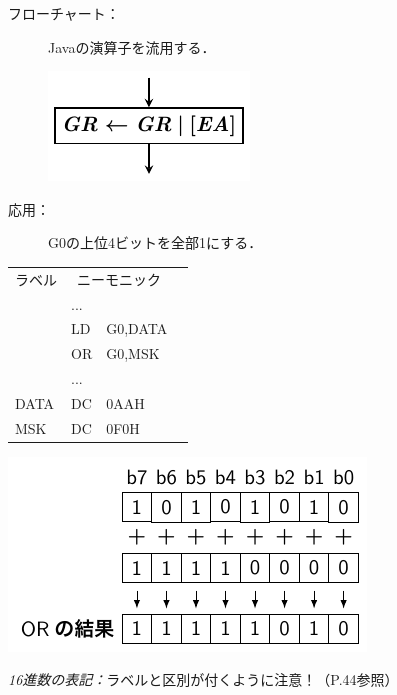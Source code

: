 \documentclass[handout]{beamer}        %
\begin{document}
\begin{frame}
  \begin{description}
  \item[フローチャート：] Javaの演算子を流用する．\\
  \vfill
    \centerline{\includegraphics[scale=0.7]{../Tikz/or_chap5.pdf}}
  \vfill
  \item[応用：] G0の上位4ビットを全部1にする．
  \end{description}
  \vfill
  \begin{minipage}{0.48\columnwidth}
    {\ttfamily\small\begin{center}
      \begin{tabular}{|l|l l|l}
        \cline{1-3}
        ラベル & \multicolumn{2}{|c|}{ニーモニック} & \\
        \cline{1-3}
        & ...  &        & \\
        & LD   & G0,DATA& \\
        & OR   & G0,MSK & \\
        & ...  &        & \\
        DATA& DC   & 0AAH    & \\
        MSK & DC   & 0F0H    & \\
        \cline{1-3}
      \end{tabular}
    \end{center}}
  \end{minipage}
  \begin{minipage}{0.48\columnwidth}
    \centerline{\includegraphics[scale=0.8]{../Tikz/lor.pdf}}
  \end{minipage}
  \vfill
  \emph{16進数の表記：}ラベルと区別が付くように注意！（P.44参照）
  \vfill
\end{frame}
\end{document}
